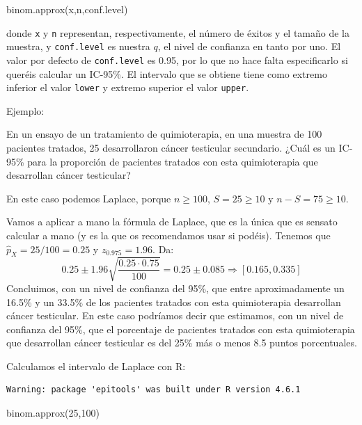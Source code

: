 \documentclass[
  spanish,
  letterpaper,
  DIV=11,
  numbers=noendperiod]{scrreprt}
\newenvironment{Shaded}{\begin{snugshade}}{\end{snugshade}}
\newcommand{\DecValTok}[1]{\textcolor[rgb]{0.68,0.00,0.00}{#1}}
\newcommand{\FunctionTok}[1]{\textcolor[rgb]{0.28,0.35,0.67}{#1}}
\newcommand{\NormalTok}[1]{\textcolor[rgb]{0.00,0.23,0.31}{#1}}
\begin{document}
\begin{Shaded}
\begin{Highlighting}[]
\FunctionTok{binom.approx}\NormalTok{(x,n,conf.level)}
\end{Highlighting}
\end{Shaded}

donde \texttt{x} y \texttt{n} representan, respectivamente, el número de
éxitos y el tamaño de la muestra, y \texttt{conf.level} es nuestra
\(q\), el nivel de confianza en tanto por uno. El valor por defecto de
\texttt{conf.level} es 0.95, por lo que no hace falta especificarlo si
queréis calcular un IC-95\%. El intervalo que se obtiene tiene como
extremo inferior el valor \texttt{lower} y extremo superior el valor
\texttt{upper}.

Ejemplo:

En un ensayo de un tratamiento de quimioterapia, en una muestra de 100
pacientes tratados, 25 desarrollaron cáncer testicular secundario. ¿Cuál
es un IC-95\% para la proporción de pacientes tratados con esta
quimioterapia que desarrollan cáncer testicular?

En este caso podemos Laplace, porque \(n\geqslant 100\),
\(S=25\geqslant 10\) y \(n-S=75\geqslant 10\).

Vamos a aplicar a mano la fórmula de Laplace, que es la única que es
sensato calcular a mano (y es la que os recomendamos usar si podéis).
Tenemos que \(\widehat{p}_{X}=25/100=0.25\) y \(z_{0.975}=1.96\). Da: \[
0.25\pm 1.96\sqrt{\frac{0.25\cdot 0.75}{100}}=0.25\pm 0.085\Rightarrow [0.165, 0.335]
\] Concluimos, con un nivel de confianza del 95\%, que entre
aproximadamente un 16.5\% y un 33.5\% de los pacientes tratados con esta
quimioterapia desarrollan cáncer testicular. En este caso podríamos
decir que estimamos, con un nivel de confianza del 95\%, que el
porcentaje de pacientes tratados con esta quimioterapia que desarrollan
cáncer testicular es del 25\% más o menos 8.5 puntos porcentuales.

Calculamos el intervalo de Laplace con R:

\begin{verbatim}
Warning: package 'epitools' was built under R version 4.6.1
\end{verbatim}

\begin{Shaded}
\begin{Highlighting}[]
\FunctionTok{binom.approx}\NormalTok{(}\DecValTok{25}\NormalTok{,}\DecValTok{100}\NormalTok{)}
\end{Highlighting}
\end{Shaded}
\end{document}
